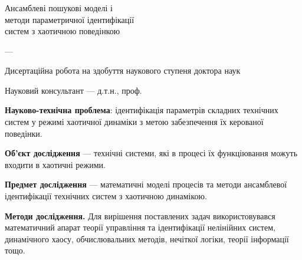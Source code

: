 \documentclass[14pt,handout,utf8]{beamer}
\author{\dissauthorUa}
\title[~]{\booknameUa}
\begin{document}
\begin{frame}
  \frametitle{}
  \begin{center}
    {\Large Ансамблеві пошукові моделі і \\ методи параметричної ідентифікації \\ систем з хаотичною поведінкою}

    \vfill

    {\small \dissSpecId --- \dissSpecUa}

    \vfill

    {\large \dissauthorMain}

    \vfill

    {\small Дисертаційна робота на здобуття наукового ступеня доктора наук}

    \vfill

    Науковий консультант --- д.т.н., проф. \\ \superUa



  \end{center}

  \vfill

  \textbf{Науково-технічна проблема}: ідентифікація параметрів складних технічних
  систем у режимі хаотичної динаміки
  з метою забезпечення їх керованої поведінки.

  \vfill

  \textbf{Об'єкт дослідження } ---
  технічні системи, які в процесі їх функціювання можуть
  входити в хаотичні режими.

  \vfill

  \textbf{Предмет дослідження } ---
  математичні моделі процесів та методи
  ансамблевої ідентифікації технічних систем з хаотичною динамікою.

  \vfill

  \textbf{Методи дослідження.}
  Для вирішення поставлених задач використовувався математичний апарат
  теорії управління та ідентифікації нелінійних систем, динамічного хаосу,
  обчислювальних методів, нечіткої логіки, теорії інформації тощо.

\end{frame}

\end{document}
